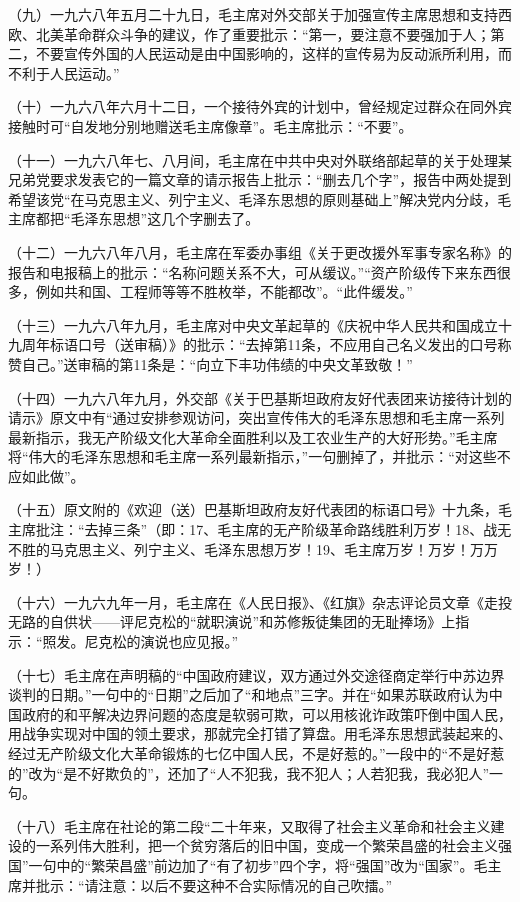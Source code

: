 （九）一九六八年五月二十九日，毛主席对外交部关于加强宣传主席思想和支持西欧、北美革命群众斗争的建议，作了重要批示：“第一，要注意不要强加于人；第二，不要宣传外国的人民运动是由中国影响的，这样的宣传易为反动派所利用，而不利于人民运动。”

（十）一九六八年六月十二日，一个接待外宾的计划中，曾经规定过群众在同外宾接触时可“自发地分别地赠送毛主席像章”。毛主席批示：“不要”。

（十一）一九六八年七、八月间，毛主席在中共中央对外联络部起草的关于处理某兄弟党要求发表它的一篇文章的请示报告上批示：“删去几个字”，报告中两处提到希望该党“在马克思主义、列宁主义、毛泽东思想的原则基础上”解决党内分歧，毛主席都把“毛泽东思想”这几个字删去了。

（十二）一九六八年八月，毛主席在军委办事组《关于更改援外军事专家名称》的报告和电报稿上的批示：“名称问题关系不大，可从缓议。”“资产阶级传下来东西很多，例如共和国、工程师等等不胜枚举，不能都改”。“此件缓发。”

（十三）一九六八年九月，毛主席对中央文革起草的《庆祝中华人民共和国成立十九周年标语口号（送审稿）》的批示：“去掉第11条，不应用自己名义发出的口号称赞自己。”送审稿的第11条是：“向立下丰功伟绩的中央文革致敬！”

（十四）一九六八年九月，外交部《关于巴基斯坦政府友好代表团来访接待计划的请示》原文中有“通过安排参观访问，突出宣传伟大的毛泽东思想和毛主席一系列最新指示，我无产阶级文化大革命全面胜利以及工农业生产的大好形势。”毛主席将“伟大的毛泽东思想和毛主席一系列最新指示，”一句删掉了，并批示：“对这些不应如此做”。

（十五）原文附的《欢迎（送）巴基斯坦政府友好代表团的标语口号》十九条，毛主席批注：“去掉三条”（即：17、毛主席的无产阶级革命路线胜利万岁！18、战无不胜的马克思主义、列宁主义、毛泽东思想万岁！19、毛主席万岁！万岁！万万岁！）

（十六）一九六九年一月，毛主席在《人民日报》、《红旗》杂志评论员文章《走投无路的自供状——评尼克松的“就职演说”和苏修叛徒集团的无耻捧场》上指示：“照发。尼克松的演说也应见报。”

（十七）毛主席在声明稿的“中国政府建议，双方通过外交途径商定举行中苏边界谈判的日期。”一句中的“日期”之后加了“和地点”三字。并在“如果苏联政府认为中国政府的和平解决边界问题的态度是软弱可欺，可以用核讹诈政策吓倒中国人民，用战争实现对中国的领土要求，那就完全打错了算盘。用毛泽东思想武装起来的、经过无产阶级文化大革命锻炼的七亿中国人民，不是好惹的。”一段中的“不是好惹的”改为“是不好欺负的”，还加了“人不犯我，我不犯人；人若犯我，我必犯人”一句。

（十八）毛主席在社论的第二段“二十年来，又取得了社会主义革命和社会主义建设的一系列伟大胜利，把一个贫穷落后的旧中国，变成一个繁荣昌盛的社会主义强国”一句中的“繁荣昌盛”前边加了“有了初步”四个字，将“强国”改为“国家”。毛主席并批示：“请注意：以后不要这种不合实际情况的自己吹擂。”

